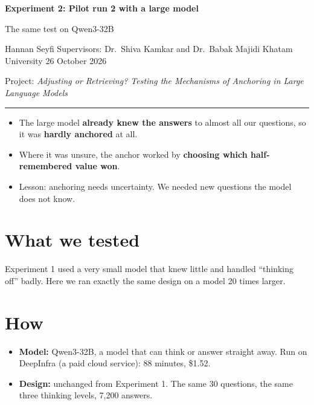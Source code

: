 \documentclass[11pt,a4paper]{article}
\newcommand{\inshort}[1]{\begin{tcolorbox}[colback=gray!6,colframe=gray!50,title=\textbf{In short},fonttitle=\normalsize]#1\end{tcolorbox}}
\newcommand{\header}[3]{%
  {\Large\textbf{#1}}\par\smallskip
  {\large #2}\par\smallskip
  {\small Hannan Seyfi \textperiodcentered{} Supervisors: Dr.\ Shiva Kamkar and Dr.\ Babak Majidi \textperiodcentered{} Khatam University \textperiodcentered{} #3}\par
  {\small Project: \emph{Adjusting or Retrieving? Testing the Mechanisms of Anchoring in Large Language Models}}\par\medskip\hrule\medskip}
\begin{document}
\header{Experiment 2: Pilot run 2 with a large model}{The same test on Qwen3-32B}{26 October 2026}

\inshort{\begin{itemize}[leftmargin=*]
  \item The large model \textbf{already knew the answers} to almost all our questions, so it was \textbf{hardly anchored} at all.
  \item Where it was unsure, the anchor worked by \textbf{choosing which half-remembered value won}.
  \item Lesson: anchoring needs uncertainty. We needed new questions the model does not know.
\end{itemize}}

\section*{What we tested}
Experiment 1 used a very small model that knew little and handled \enquote{thinking off} badly. Here we ran exactly the same design on a model 20 times larger.

\section*{How}
\begin{itemize}[leftmargin=*]
  \item \textbf{Model:} Qwen3-32B, a model that can think or answer straight away. Run on DeepInfra (a paid cloud service): 88 minutes, \$1.52.
  \item \textbf{Design:} unchanged from Experiment 1. The same 30 questions, the same three thinking levels, 7,200 answers.
\end{itemize}
\end{document}
